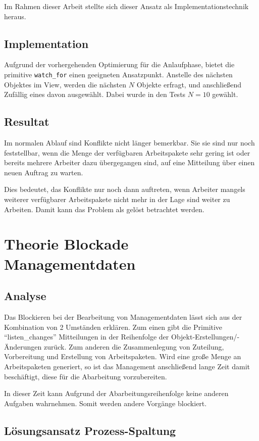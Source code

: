 Im Rahmen dieser Arbeit stellte sich dieser Ansatz als Implementationstechnik heraus.


\subsection{Implementation}

Aufgrund der vorhergehenden Optimierung für die Anlaufphase,
bietet die primitive \verb|watch_for| einen geeigneten Ansatzpunkt.
Anstelle des nächsten Objektes im View, werden die nächsten $N$ Objekte erfragt,
und anschließend Zufällig eines davon ausgewählt.
Dabei wurde in den Tests $N = 10$ gewählt.

\subsection{Resultat}
Im normalen Ablauf sind Konflikte nicht länger bemerkbar.
Sie sie sind nur noch feststellbar, wenn die Menge der verfügbaren Arbeitspakete
sehr gering ist oder bereits mehrere Arbeiter dazu übergegangen sind,
auf eine Mitteilung über einen neuen Auftrag zu warten.

Dies bedeutet, das Konflikte nur noch dann auftreten,
wenn Arbeiter mangels weiterer verfügbarer Arbeitspakete nicht mehr in der Lage sind weiter zu Arbeiten. Damit kann das Problem als gelöst betrachtet werden.

\section{Theorie Blockade Managementdaten}
\subsection{Analyse}
Das Blockieren bei der Bearbeitung von Managementdaten lässt sich
aus der Kombination von 2 Umständen erklären.
Zum einen gibt die Primitive ``listen\_changes'' Mitteilungen
in der Reihenfolge der Objekt-Erstellungen/-Änderungen zurück.
Zum anderen die Zusammenlegung von Zuteilung, Vorbereitung
und Erstellung von Arbeitspaketen.
Wird eine große Menge an Arbeitspaketen generiert,
so ist das Management anschließend lange Zeit damit beschäftigt,
diese für die Abarbeitung vorzubereiten.

In dieser Zeit kann Aufgrund der Abarbeitungsreihenfolge
keine anderen Aufgaben wahrnehmen.
Somit werden andere Vorgänge blockiert.

\subsection{Lösungsansatz Prozess-Spaltung}

